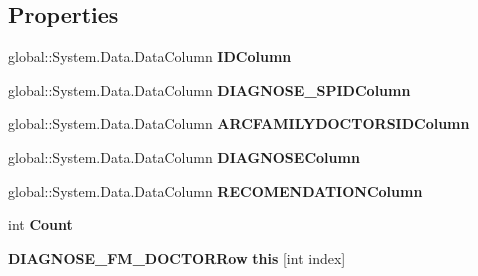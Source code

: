 \subsection*{Properties}
\begin{CompactItemize}
\item 
global::System.Data.DataColumn \textbf{IDColumn}\hspace{0.3cm}{\tt  [get]}\label{class_automatic_medical_system_1_1_data_set2_1_1_d_i_a_g_n_o_s_e___f_m___d_o_c_t_o_r_data_table_7240e42c0a36c84afac73bbf1137ea0a}

\item 
global::System.Data.DataColumn \textbf{DIAGNOSE\_\-SPIDColumn}\hspace{0.3cm}{\tt  [get]}\label{class_automatic_medical_system_1_1_data_set2_1_1_d_i_a_g_n_o_s_e___f_m___d_o_c_t_o_r_data_table_0c35e3beceede5246a0ee352330149f1}

\item 
global::System.Data.DataColumn \textbf{ARCFAMILYDOCTORSIDColumn}\hspace{0.3cm}{\tt  [get]}\label{class_automatic_medical_system_1_1_data_set2_1_1_d_i_a_g_n_o_s_e___f_m___d_o_c_t_o_r_data_table_ece82ca1067fbe5779b62af3dcab915b}

\item 
global::System.Data.DataColumn \textbf{DIAGNOSEColumn}\hspace{0.3cm}{\tt  [get]}\label{class_automatic_medical_system_1_1_data_set2_1_1_d_i_a_g_n_o_s_e___f_m___d_o_c_t_o_r_data_table_d9e7444d5e53f34da9b311ee7193e3da}

\item 
global::System.Data.DataColumn \textbf{RECOMENDATIONColumn}\hspace{0.3cm}{\tt  [get]}\label{class_automatic_medical_system_1_1_data_set2_1_1_d_i_a_g_n_o_s_e___f_m___d_o_c_t_o_r_data_table_812e8b0579b352a624fc8ad74d20b9fa}

\item 
int \textbf{Count}\hspace{0.3cm}{\tt  [get]}\label{class_automatic_medical_system_1_1_data_set2_1_1_d_i_a_g_n_o_s_e___f_m___d_o_c_t_o_r_data_table_a61913ddc978dfd9f694b056f3b3b519}

\item 
{\bf DIAGNOSE\_\-FM\_\-DOCTORRow} \textbf{this} [int index]\hspace{0.3cm}{\tt  [get]}\label{class_automatic_medical_system_1_1_data_set2_1_1_d_i_a_g_n_o_s_e___f_m___d_o_c_t_o_r_data_table_03590092a38238bbec33e7cf5c103116}

\end{CompactItemize}
